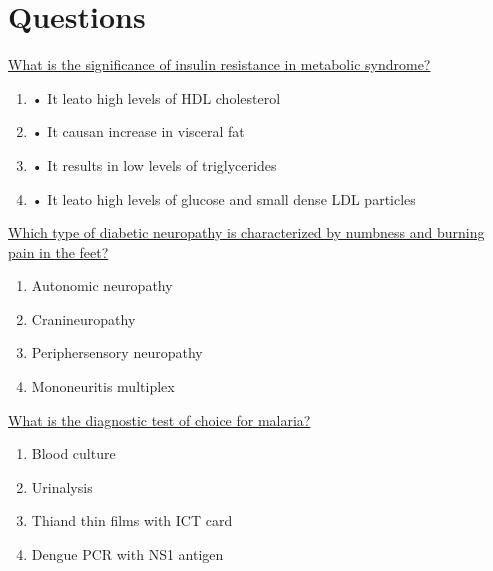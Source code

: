 \documentclass[10pt, a4paper]{article}
\begin{document}
 
\section{Questions} 

 \begin{enumerate} 

\parbox{\linewidth}{\item \href{https://www.notion.so/Cardiometabolic-Syndrome-2217e00035bb4d999ce7d5b4f16ff92d}{ What is the significance of insulin resistance in metabolic syndrome?} 
 \begin{enumerate}
 \item • It leato high levels of HDL cholesterol
 \item • It causan increase in visceral fat
 \item • It results in low levels of triglycerides
 \item • It leato high levels of glucose and small dense LDL particles
 \end{enumerate}} 

 \vspace{12pt} 

\parbox{\linewidth}{\item \href{https://www.notion.so/Complications-of-diabetes-8ddddcd5b33741798fc788acb1719161}{ Which type of diabetic neuropathy is characterized by numbness and burning pain in the feet?} 
 \begin{enumerate}
 \item Autonomic neuropathy
 \item Cranineuropathy
 \item Periphersensory neuropathy
 \item Mononeuritis multiplex
 \end{enumerate}} 

 \vspace{12pt} 

\parbox{\linewidth}{\item \href{https://www.notion.so/Travel-Medicine-9056ae798e724a16b56ec93bf312ef5a}{ What is the diagnostic test of choice for malaria?} 
 \begin{enumerate}
 \item      Blood culture
 \item      Urinalysis
 \item      Thiand thin films with ICT card
 \item      Dengue PCR with NS1 antigen
 \end{enumerate}} 


\end{enumerate}
\end{document}
